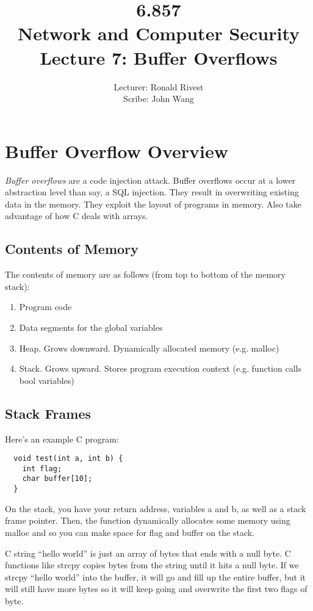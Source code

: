\documentclass[psamsfonts]{amsart}
\title{6.857 \\
Network and Computer Security \\
Lecture 7: Buffer Overflows}
\author{Lecturer: Ronald Rivest\\
Scribe: John Wang}
\begin{document}
\maketitle

\section{Buffer Overflow Overview}

\emph{Buffer overflows} are a code injection attack. Buffer overflows occur at a lower abstraction level than say, a SQL injection. They result in overwriting existing data in the memory. They exploit the layout of programs in memory. Also take advantage of how C deals with arrays.

\subsection{Contents of Memory}

The contents of memory are as follows (from top to bottom of the memory stack):
\begin{enumerate}
  \item Program code
  \item Data segments for the global variables
  \item Heap. Grows downward. Dynamically allocated memory (e.g. malloc)
  \item Stack. Grows upward. Stores program execution context (e.g. function calls bool variables)
\end{enumerate}

\subsection{Stack Frames}

Here's an example C program:

\begin{verbatim}
  void test(int a, int b) {
    int flag;
    char buffer[10];
  }
\end{verbatim}

On the stack, you have your return address, variables a and b, as well as a stack frame pointer. Then, the function dynamically allocates some memory using malloc and so you can make space for flag and buffer on the stack.

C string ``hello world'' is just an array of bytes that ends with a null byte. C functions like strcpy copies bytes from the string until it hits a null byte. If we strcpy ``hello world'' into the buffer, it will go and fill up the entire buffer, but it will still have more bytes so it will keep going and overwrite the first two flags of byte.
\end{document}
